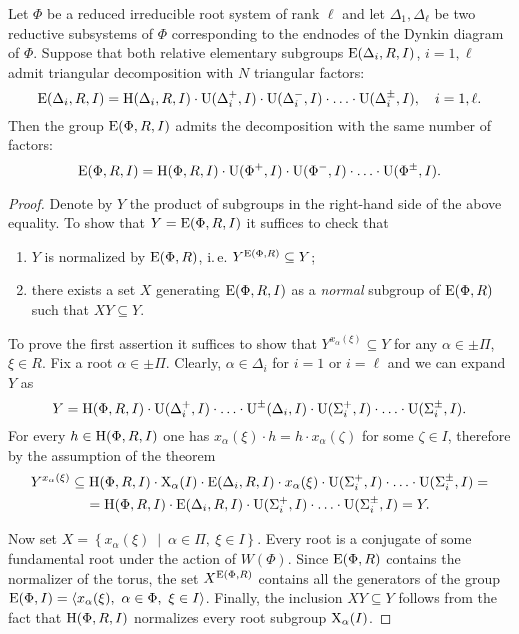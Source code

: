 \begin{thm}\label{thm:Gauss}
Let $\Phi$ be a reduced irreducible root system of rank $\ell$ and let $\Delta_1, \Delta_\ell$ be
two reductive subsystems of $\Phi$ corresponding to the endnodes of the Dynkin diagram of $\Phi$.
Suppose that both relative elementary subgroups $\operatorname{E}(\Delta_i, R, I)$, $i=1,\ell$ admit triangular decomposition with $N$ triangular factors:
\[ \operatorname{E}(\Delta_i, R, I) = \operatorname{H}(\Delta_i, R, I) \cdot \operatorname{U}(\Delta^+_i, I) \cdot \operatorname{U}(\Delta^-_i, I) \cdot \ldots \cdot \operatorname{U}(\Delta^\pm_i, I),\quad i=1,\ell. \]
Then the group $\operatorname{E}(\Phi, R, I)$ admits the decomposition with the same number of factors:
\[ \operatorname{E}(\Phi, R, I) = \operatorname{H}(\Phi,R,I) \cdot \operatorname{U}(\Phi^+,I) \cdot \operatorname{U}(\Phi^-, I) \cdot \ldots \cdot \operatorname{U}(\Phi^\pm,I). \]
\end{thm}
\begin{proof}
Denote by $Y$ the product of subgroups in the right-hand side of the above equality.
To show that $Y=\operatorname{E}(\Phi,R,I)$ it suffices to check that
\begin{enumerate}
\item $Y$ is normalized by $\operatorname{E}(\Phi,R)$, i.\,e. $Y^{\operatorname{E}(\Phi,R)}\subseteq Y$;
\item there exists a set $X$ generating $\operatorname{E}(\Phi,R,I)$ as a \emph{normal} subgroup of $\operatorname{E}(\Phi,R)$ such that $XY\subseteq Y$.
\end{enumerate}
To prove the first assertion it suffices to show that $Y^{x_\alpha(\xi)} \subseteq Y$ for any $\alpha\in \pm \Pi$, $\xi\in R$.
Fix a root $\alpha\in\pm\Pi$. Clearly, $\alpha \in \Delta_i$ for $i=1$ or $i=\ell$ and we can expand $Y$ as
\[ Y=\operatorname{H}(\Phi,R,I) \cdot \operatorname{U}(\Delta_i^+,I) \cdot \ldots \cdot \operatorname{U}^\pm(\Delta_i,I) \cdot \operatorname{U}(\Sigma_i^+,I) \cdot \ldots \cdot \operatorname{U}(\Sigma_i^\pm,I). \]
For every  $h \in \operatorname{H}(\Phi, R, I)$ one has $x_\alpha(\xi)\cdot h = h\cdot x_\alpha(\zeta)$ for some $\zeta\in I$, therefore by the assumption of the theorem
\begin{multline*}
Y^{x_\alpha(\xi)} \subseteq \operatorname{H}(\Phi,R,I) \cdot \operatorname{X}_{\alpha}(I) \cdot \operatorname{E}(\Delta_i,R,I)\cdot x_\alpha(\xi) \cdot \operatorname{U}(\Sigma^+_i,I) \cdot \ldots \cdot \operatorname{U}(\Sigma^\pm_i,I) =\\
= \operatorname{H}(\Phi, R, I) \cdot \operatorname{E}(\Delta_i,R,I) \cdot \operatorname{U}(\Sigma^+_i,I) \cdot \ldots \cdot \operatorname{U}(\Sigma^\pm_i,I) = Y.
\end{multline*}

Now set $X=\left\{x_\alpha(\xi)\ \middle|\ \alpha\in\Pi,\ \xi\in I \right\}$. 
Every root is a conjugate of some fundamental root under the action of $W(\Phi)$.
Since $\operatorname{E}(\Phi,R)$ contains the normalizer of the torus, the set $X^{\operatorname{E}(\Phi,R)}$ contains all the generators of the group $\operatorname{E}(\Phi, I) = \langle x_\alpha(\xi),\  \alpha\in\Phi,\ \xi\in I \rangle$.
Finally, the inclusion $XY \subseteq Y$ follows from the fact that $\operatorname{H}(\Phi,R,I)$ normalizes every root subgroup $\operatorname{X}_\alpha(I)$.
\end{proof}